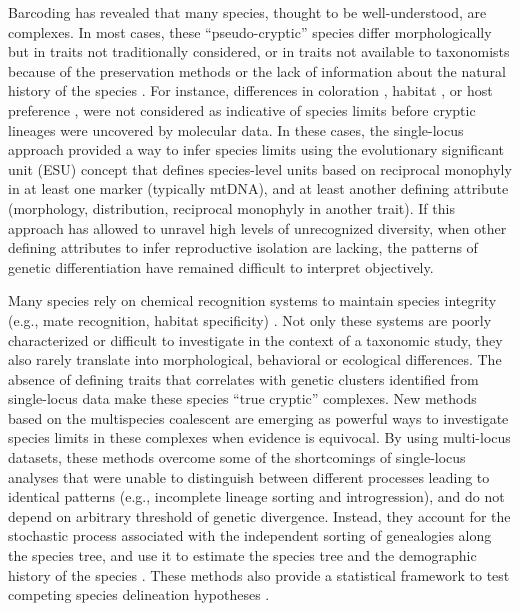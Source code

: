 \documentclass[12pt,letterpaper]{article}\usepackage[]{graphicx}\usepackage[]{color}
\begin{document}
Barcoding has revealed that many species, thought to be well-understood, are
complexes. In most cases, these ``pseudo-cryptic'' species differ
morphologically but in traits not traditionally considered, or in traits not
available to taxonomists because of the preservation methods or the lack of
information about the natural history of the species \citep{Knowlton1993}. For
instance, differences in coloration \citep{Brown2007,Malay2010}, habitat
\citep{Prada2013}, or host preference \citep{Hebert2004}, were not considered as
indicative of species limits before cryptic lineages were uncovered by molecular
data. In these cases, the single-locus approach provided a way to infer species
limits using the evolutionary significant unit (ESU) concept \citep{Moritz1994}
that defines species-level units based on reciprocal monophyly in at least one
marker (typically mtDNA), and at least another defining attribute (morphology,
distribution, reciprocal monophyly in another trait). If this approach has
allowed to unravel high levels of unrecognized diversity, when other defining
attributes to infer reproductive isolation are lacking, the patterns of genetic
differentiation have remained difficult to interpret objectively.

Many species rely on chemical recognition systems to maintain species integrity
(e.g., mate recognition, habitat specificity) \citep{Knowlton1993}. Not only
these systems are poorly characterized or difficult to investigate in the
context of a taxonomic study, they also rarely translate into morphological,
behavioral or ecological differences. The absence of defining traits that
correlates with genetic clusters identified from single-locus data make these
species ``true cryptic'' complexes. New methods based on the multispecies
coalescent are emerging as powerful ways to investigate species limits in these
complexes when evidence is equivocal. By using multi-locus datasets, these
methods overcome some of the shortcomings of single-locus analyses that were
unable to distinguish between different processes leading to identical patterns
(e.g., incomplete lineage sorting and introgression), and do not depend on
arbitrary threshold of genetic divergence. Instead, they account for the
stochastic process associated with the independent sorting of genealogies along
the species tree, and use it to estimate the species tree and the demographic
history of the species \citep{Fujita2012a}. These methods also provide a
statistical framework to test competing species delineation hypotheses
\citep{Baele2012}.
\end{document}
